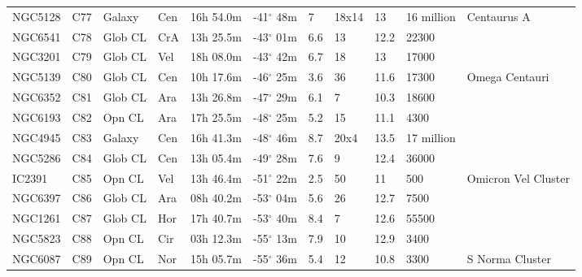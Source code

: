 \documentclass[10pt,twoside,a4paper,english]{article}
\begin{document}
\begin{longtable}{@{}lllllllllll@{}}
NGC5128    & C77           & Galaxy  & Cen & 16h 54.0m & -41$^{\circ}$ 48m & 7    & 18x14          & 13   & 16 million    & Centaurus A                     \\ 
NGC6541    & C78           & Glob CL & CrA & 13h 25.5m & -43$^{\circ}$ 01m & 6.6  & 13             & 12.2 & 22300         &                                 \\ 
NGC3201    & C79           & Glob CL & Vel & 18h 08.0m & -43$^{\circ}$ 42m & 6.7  & 18             & 13   & 17000         &                                 \\ 
NGC5139    & C80           & Glob CL & Cen & 10h 17.6m & -46$^{\circ}$ 25m & 3.6  & 36             & 11.6 & 17300         & Omega Centauri                  \\ 
NGC6352    & C81           & Glob CL & Ara & 13h 26.8m & -47$^{\circ}$ 29m & 6.1  & 7              & 10.3 & 18600         &                                 \\ 
NGC6193    & C82           & Opn CL  & Ara & 17h 25.5m & -48$^{\circ}$ 25m & 5.2  & 15             & 11.1 & 4300          &                                 \\ 
NGC4945    & C83           & Galaxy  & Cen & 16h 41.3m & -48$^{\circ}$ 46m & 8.7  & 20x4           & 13.5 & 17 million    &                                 \\ 
NGC5286    & C84           & Glob CL & Cen & 13h 05.4m & -49$^{\circ}$ 28m & 7.6  & 9              & 12.4 & 36000         &                                 \\ 
IC2391     & C85           & Opn CL  & Vel & 13h 46.4m & -51$^{\circ}$ 22m & 2.5  & 50             & 11   & 500           & Omicron Vel Cluster             \\ 
NGC6397    & C86           & Glob CL & Ara & 08h 40.2m & -53$^{\circ}$ 04m & 5.6  & 26             & 12.7 & 7500          &                                 \\ 
NGC1261    & C87           & Glob CL & Hor & 17h 40.7m & -53$^{\circ}$ 40m & 8.4  & 7              & 12.6 & 55500         &                                 \\ 
NGC5823    & C88           & Opn CL  & Cir & 03h 12.3m & -55$^{\circ}$ 13m & 7.9  & 10             & 12.9 & 3400          &                                 \\ 
NGC6087    & C89           & Opn CL  & Nor & 15h 05.7m & -55$^{\circ}$ 36m & 5.4  & 12             & 10.8 & 3300          & S Norma Cluster                 \\ 

\end{longtable}
\end{document}
